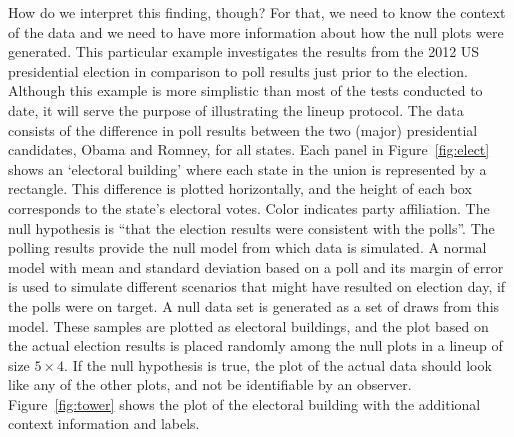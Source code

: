 \documentclass[10pt]{article}\usepackage[]{graphicx}\usepackage[]{color}
\begin{document}
How do we interpret this finding, though? For that, we need to know the context of the data and we need to have more information about how the null plots were generated. 
This particular example investigates the results from the 2012 US presidential election in comparison to  poll results just prior to the election. 
Although this example is more simplistic than most of the tests conducted to date, it will serve the purpose of illustrating the lineup protocol. The data consists of the difference in poll results between the two (major) presidential candidates, Obama and Romney, for all states. Each panel in Figure~\ref{fig:elect} shows an `electoral building' \citep{mosley2010} where each state in the union is represented by a rectangle. This difference is plotted horizontally, and the height of each box corresponds to the state's electoral votes. Color indicates party affiliation.  The null hypothesis is ``that the election results were consistent with the polls''. The polling results provide the null model from which data is simulated. A normal model with mean and standard deviation based on a poll and its margin of error is used to simulate different scenarios that might have resulted on election day, if the polls were on target. A null data set is generated as a set of draws from this model. %
These samples are plotted as electoral buildings, and the plot based on the actual election results is placed randomly among the null plots in a lineup of size $5\times 4$. If the null hypothesis is true, the  plot of the actual data should look  like any of the other plots, and not be identifiable by an observer. Figure~\ref{fig:tower} shows the plot of the electoral building with the additional context information and labels.
\end{document}
